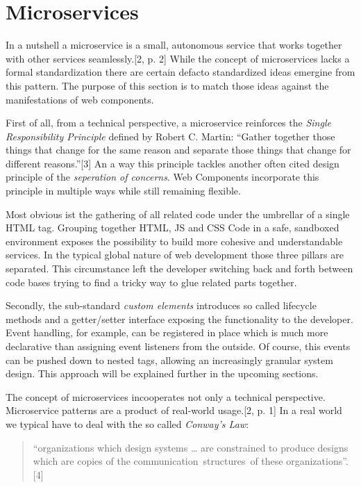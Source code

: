 \documentclass[]{assets/latex/ieee}
\begin{document}
\section{Microservices}\label{microservices}

In a nutshell a microservice is a small, autonomous service that works
together with other services seamlessly.{[}2, p. 2{]} While the concept
of microservices lacks a formal standardization there are certain
defacto standardized ideas emergine from this pattern. The purpose of
this section is to match those ideas against the manifestations of web
components.

First of all, from a technical perspective, a microservice reinforces
the \emph{Single Responsibility Principle} defined by Robert C. Martin:
``Gather together those things that change for the same reason and
separate those things that change for different reasons.''{[}3{]} An a
way this principle tackles another often cited design principle of the
\emph{seperation of concerns}. Web Components incorporate this principle
in multiple ways while still remaining flexible.

Most obvious ist the gathering of all related code under the umbrellar
of a single HTML tag. Grouping together HTML, JS and CSS Code in a safe,
sandboxed environment exposes the possibility to build more cohesive and
understandable services. In the typical global nature of web development
those three pillars are separated. This circumstance left the developer
switching back and forth between code bases trying to find a tricky way
to glue related parts together.

Secondly, the sub-standard \emph{custom elements} introduces so called
lifecycle methods and a getter/setter interface exposing the
functionality to the developer. Event handling, for example, can be
registered in place which is much more declarative than assigning event
listeners from the outside. Of course, this events can be pushed down to
nested tags, allowing an increasingly granular system design. This
approach will be explained further in the upcoming sections.

The concept of microservices incooperates not only a technical
perspective. Microservice patterns are a product of real-world
usage.{[}2, p. 1{]} In a real world we typical have to deal with the so
called \emph{Conway's Law}:

\begin{quote}
``organizations which design systems \ldots{} are constrained to produce
designs which are copies of the communication~structures~of these
organizations''. {[}4{]}
\end{quote}
\end{document}

